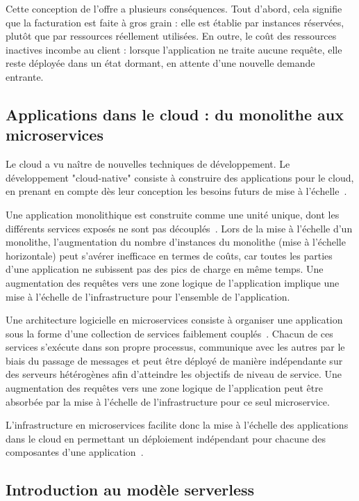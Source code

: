 Cette conception de l'offre a plusieurs conséquences. Tout d'abord, cela signifie que la facturation est faite à gros grain : elle est établie par instances réservées, plutôt que par ressources réellement utilisées. En outre, le coût des ressources inactives incombe au client : lorsque l'application ne traite aucune requête, elle reste déployée dans un état dormant, en attente d'une nouvelle demande entrante.

\subsection{Applications dans le cloud : du monolithe aux microservices}

Le cloud a vu naître de nouvelles techniques de développement. Le développement "cloud-native" consiste à construire des applications pour le cloud, en prenant en compte dès leur conception les besoins futurs de mise à l'échelle~\cite{dragoniMicroservicesHowMake2018, martinfowler2014microservices}.

Une application monolithique est construite comme une unité unique, dont les différents services exposés ne sont pas découplés~\cite{villamizarEvaluatingMonolithicMicroservice2015}. Lors de la mise à l'échelle d'un monolithe, l'augmentation du nombre d'instances du monolithe (mise à l'échelle horizontale) peut s'avérer inefficace en termes de coûts, car toutes les parties d'une application ne subissent pas des pics de charge en même temps. Une augmentation des requêtes vers une zone logique de l'application implique une mise à l'échelle de l'infrastructure pour l'ensemble de l'application.

Une architecture logicielle en microservices consiste à organiser une application sous la forme d'une collection de services faiblement couplés~\cite{12factor}. Chacun de ces services s'exécute dans son propre processus, communique avec les autres par le biais du passage de messages et peut être déployé de manière indépendante sur des serveurs hétérogènes afin d'atteindre les objectifs de niveau de service. Une augmentation des requêtes vers une zone logique de l'application peut être absorbée par la mise à l'échelle de l'infrastructure pour ce seul microservice.

L'infrastructure en microservices facilite donc la mise à l'échelle des applications dans le cloud en permettant un déploiement indépendant pour chacune des composantes d'une application~\cite{vaneykSPECRGReferenceArchitecture2019}.

\subsection{Introduction au modèle serverless}

